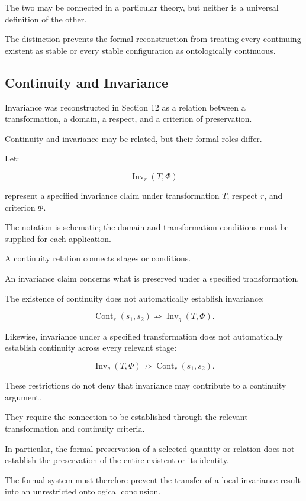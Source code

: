 The two may be connected in
a particular theory, but neither
is a universal definition of
the other.

The distinction prevents the
formal reconstruction from
treating every continuing
existent as stable or every
stable configuration as
ontologically continuous.

\subsection{Continuity and Invariance}

Invariance was reconstructed
in Section 12 as a relation
between a transformation,
a domain, a respect, and
a criterion of preservation.

Continuity and invariance
may be related, but their
formal roles differ.

Let:

\[
    \operatorname{Inv}_{r}(T,\Phi)
\]

represent a specified invariance
claim under transformation \(T\),
respect \(r\), and criterion
\(\Phi\).

The notation is schematic;
the domain and transformation
conditions must be supplied
for each application.

A continuity relation connects
stages or conditions.

An invariance claim concerns
what is preserved under a
specified transformation.

The existence of continuity
does not automatically establish
invariance:

\[
    \operatorname{Cont}_{r}(s_1,s_2)
    \not\Rightarrow
    \operatorname{Inv}_{q}(T,\Phi).
\]

Likewise, invariance under
a specified transformation
does not automatically establish
continuity across every relevant
stage:

\[
    \operatorname{Inv}_{q}(T,\Phi)
    \not\Rightarrow
    \operatorname{Cont}_{r}(s_1,s_2).
\]

These restrictions do not
deny that invariance may
contribute to a continuity
argument.

They require the connection
to be established through
the relevant transformation
and continuity criteria.

In particular, the formal
preservation of a selected
quantity or relation does
not establish the preservation
of the entire existent or
its identity.

The formal system must
therefore prevent the
transfer of a local invariance
result into an unrestricted
ontological conclusion.


